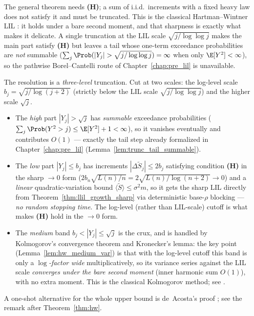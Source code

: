 The general theorem needs \textbf{(H)}; a sum of i.i.d.\ increments with a fixed heavy
law does not satisfy it and must be truncated. This is the classical Hartman--Wintner
LIL \cite{HartmanWintner1941}: it holds under a bare second moment, and that sharpness
is exactly what makes it delicate. A single truncation at the LIL scale
$\sqrt{j/\log\log j}$ makes the main part satisfy \textbf{(H)} but leaves a tail whose
one-term exceedance probabilities are \emph{not} summable ($\sum_j\Prob(|Y_j|>
\sqrt{j/\log\log j})=\infty$ when only $\E[Y^2]<\infty$), so the pathwise
Borel--Cantelli route of Chapter~\ref{chap:pre_lil} is unavailable.

The resolution is a \emph{three-level} truncation. Cut at two scales: the log-level scale
$b_j=\sqrt{j/\log(j+2)}$ (strictly below the LIL scale $\sqrt{j/\log\log j}$) and the
higher scale $\sqrt j$.
\begin{itemize}
  \item The \emph{high} part $|Y_j|>\sqrt j$ has \emph{summable} exceedance
        probabilities ($\sum_j\Prob(Y^2>j)\le\E[Y^2]+1<\infty$), so it vanishes
        eventually and contributes $O(1)$ --- exactly the tail step already formalized
        in Chapter~\ref{chap:pre_lil} (Lemma~\ref{lem:trunc_tail_summable}).
  \item The \emph{low} part $|Y_j|\le b_j$ has increments $|\Delta\tilde S_j|\le2b_j$
        satisfying condition \textbf{(H)} in the sharp $\to0$ form
        ($2b_n\sqrt{L(n)/n}=2\sqrt{L(n)/\log(n+2)}\to0$) and a \emph{linear}
        quadratic-variation bound $\langle\tilde S\rangle\le\sigma^2 m$, so it gets the
        sharp LIL directly from Theorem~\ref{thm:llil_growth_sharp} via deterministic
        base-$\rho$ blocking --- \emph{no random stopping time}. The log-level (rather than
        LIL-scale) cutoff is what makes \textbf{(H)} hold in the $\to0$ form.
  \item The \emph{medium} band $b_j<|Y_j|\le\sqrt j$ is the crux, and is handled by
        Kolmogorov's convergence theorem and Kronecker's lemma: the key point
        (Lemma~\ref{lem:hw_medium_var}) is that with the log-level cutoff this band is only
        a \emph{$\log$-factor wide} multiplicatively, so its variance series against
        the LIL scale \emph{converges under the bare second moment} (inner harmonic sum
        $O(1)$), with no extra moment. This is the classical Kolmogorov method; see
        \cite{Stout1974,heyde1980}.
\end{itemize}
A one-shot alternative for the whole upper bound is de~Acosta's proof
\cite{deAcosta1983}; see the remark after Theorem~\ref{thm:hw}.

